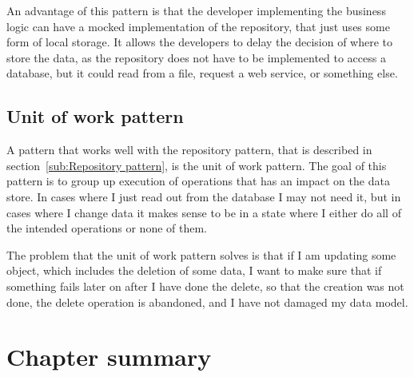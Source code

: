 An advantage of this pattern is that the developer implementing the business logic can have a mocked implementation of the repository, that just uses some form of local storage. It allows the developers to delay the decision of where to store the data, as the repository does not have to be implemented to access a database, but it could read from a file, request a web service, or something else\cite{repository_pattern}.

\subsection{Unit of work pattern}
\label{sub:Unit of work pattern}
A pattern that works well with the repository pattern, that is described in section~\ref{sub:Repository pattern}, is the unit of work pattern. The goal of this pattern is to group up execution of operations that has an impact on the data store. In cases where I just read out from the database I may not need it, but in cases where I change data it makes sense to be in a state where I either do all of the intended operations or none of them.

The problem that the unit of work pattern solves is that if I am updating some object, which includes the deletion of some data, I want to make sure that if something fails later on after I have done the delete, so that the creation was not done, the delete operation is abandoned, and I have not damaged my data model\cite{uow}.

\section{Chapter summary}
